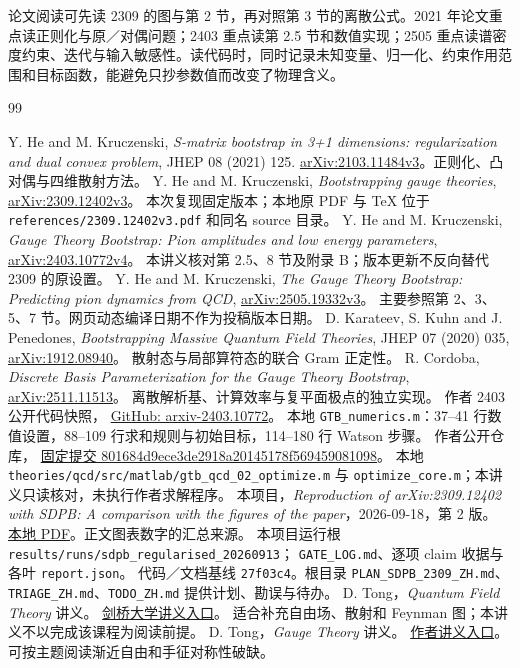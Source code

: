\documentclass[UTF8,a4paper,11pt,fontset=fandol]{ctexart}
\numberwithin{equation}{section}
\newcommand{\code}[1]{{\urlstyle{tt}\nolinkurl{#1}}}
\begin{document}
论文阅读可先读 2309 的图与第 2 节，再对照第 3 节的离散公式。2021 年论文重点读正则化与原／对偶问题；2403 重点读第 2.5 节和数值实现；2505 重点读谱密度约束、迭代与输入敏感性。读代码时，同时记录未知变量、归一化、约束作用范围和目标函数，能避免只抄参数值而改变了物理含义。
\clearpage
{}
{}
\renewcommand{\refname}{参考资料}
\begin{thebibliography}{99}
\small\raggedright
{} Y. He and M. Kruczenski,
\textit{S-matrix bootstrap in 3+1 dimensions: regularization and dual convex problem},
JHEP 08 (2021) 125.
\href{https://arxiv.org/abs/2103.11484}{arXiv:2103.11484v3}。正则化、凸对偶与四维散射方法。
 Y. He and M. Kruczenski,
\textit{Bootstrapping gauge theories},
\href{https://arxiv.org/abs/2309.12402v3}{arXiv:2309.12402v3}。
本次复现固定版本；本地原 PDF 与 TeX 位于 \code{references/2309.12402v3.pdf} 和同名 source 目录。
 Y. He and M. Kruczenski,
\textit{Gauge Theory Bootstrap: Pion amplitudes and low energy parameters},
\href{https://arxiv.org/abs/2403.10772v4}{arXiv:2403.10772v4}。
本讲义核对第 2.5、8 节及附录 B；版本更新不反向替代 2309 的原设置。
 Y. He and M. Kruczenski,
\textit{The Gauge Theory Bootstrap: Predicting pion dynamics from QCD},
\href{https://arxiv.org/abs/2505.19332v3}{arXiv:2505.19332v3}。
主要参照第 2、3、5、7 节。网页动态编译日期不作为投稿版本日期。
 D. Karateev, S. Kuhn and J. Penedones,
\textit{Bootstrapping Massive Quantum Field Theories},
JHEP 07 (2020) 035,
\href{https://arxiv.org/abs/1912.08940}{arXiv:1912.08940}。
散射态与局部算符态的联合 Gram 正定性。
 R. Cordoba,
\textit{Discrete Basis Parameterization for the Gauge Theory Bootstrap},
\href{https://arxiv.org/abs/2511.11513}{arXiv:2511.11513}。
离散解析基、计算效率与复平面极点的独立实现。
 作者 2403 公开代码快照，
\href{https://github.com/hyfysics/gauge-theory-bootstrap/releases/tag/arxiv-2403.10772}{GitHub: arxiv-2403.10772}。
本地 \code{GTB_numerics.m}：37--41 行数值设置，88--109 行求和规则与初始目标，114--180 行 Watson 步骤。
 作者公开仓库，
\href{https://github.com/hyfysics/gauge-theory-bootstrap/tree/801684d9ece3de2918a20145178f569459081098}{固定提交 801684d9ece3de2918a20145178f569459081098}。
本地 \code{theories/qcd/src/matlab/gtb_qcd_02_optimize.m} 与 \code{optimize_core.m}；本讲义只读核对，未执行作者求解程序。
 本项目，\textit{Reproduction of arXiv:2309.12402 with SDPB: A comparison with the figures of the paper}，2026-09-18，第 2 版。
\href{../reproduction_2309/REPRODUCTION_COMPARISON_EN.pdf}{本地 PDF}。正文图表数字的汇总来源。
 本项目运行根 \code{results/runs/sdpb_regularised_20260913}；
\code{GATE_LOG.md}、逐项 claim 收据与各叶 \code{report.json}。
代码／文档基线 \code{27f03c4}。根目录 \code{PLAN_SDPB_2309_ZH.md}、\code{TRIAGE_ZH.md}、\code{TODO_ZH.md} 提供计划、勘误与待办。
 D. Tong，\textit{Quantum Field Theory} 讲义。
\href{https://www.damtp.cam.ac.uk/user/tong/qft.html}{剑桥大学讲义入口}。
适合补充自由场、散射和 Feynman 图；本讲义不以完成该课程为阅读前提。
 D. Tong，\textit{Gauge Theory} 讲义。
\href{https://davidtong.org/teaching/gauge-theory/}{作者讲义入口}。
可按主题阅读渐近自由和手征对称性破缺。
\end{thebibliography}
\end{document}
